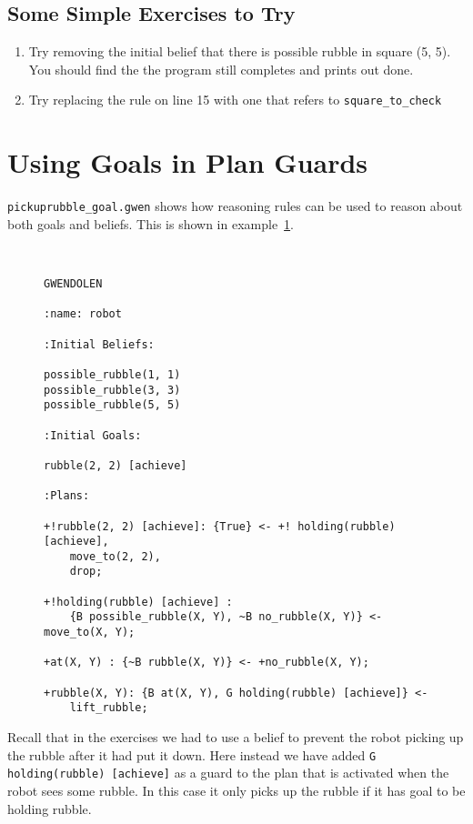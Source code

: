 \subsection{Some Simple Exercises to Try}
\begin{enumerate}
\item Try removing the initial belief that there is possible rubble in square (5, 5).  You should find the the program still completes and prints out done.
\item Try replacing the rule on line 15 with one that refers to \lstinline{square_to_check}
\end{enumerate}



\section{Using Goals in Plan Guards}

\texttt{pickuprubble\_goal.gwen} shows how reasoning rules can be used to reason about both goals and beliefs.  This is shown in example~\ref{code:pickuprubble_goal}.
\begin{figure}[htb]
\begin{ourexample}
\label{code:pickuprubble_goal} \quad \\
\begin{lstlisting}[basicstyle=\sffamily,style=easslisting,language=Gwendolen]
GWENDOLEN

:name: robot

:Initial Beliefs:

possible_rubble(1, 1)
possible_rubble(3, 3)
possible_rubble(5, 5)

:Initial Goals:

rubble(2, 2) [achieve]

:Plans:

+!rubble(2, 2) [achieve]: {True} <- +! holding(rubble)[achieve],
    move_to(2, 2), 
    drop;

+!holding(rubble) [achieve] : 
    {B possible_rubble(X, Y), ~B no_rubble(X, Y)} <- move_to(X, Y);

+at(X, Y) : {~B rubble(X, Y)} <- +no_rubble(X, Y);

+rubble(X, Y): {B at(X, Y), G holding(rubble) [achieve]} <- 
    lift_rubble;
\end{lstlisting}
\end{ourexample}
\end{figure}
Recall that in the exercises  we had to use a belief to prevent the robot picking up the rubble after it had put it down.  Here instead we have added \lstinline{G holding(rubble) [achieve]} as a guard to the plan that is activated when the robot sees some rubble.  In this case it only picks up the rubble if it has goal to be holding rubble.

